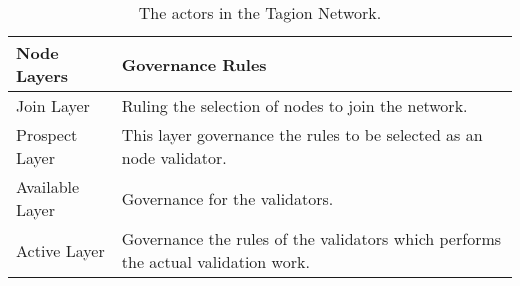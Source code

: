 \begin{table}[H]
 \begin{center}
  \begin{tabular}{|p{4cm}|p{8cm}|}
   \hline
   Node Layers & Governance Rules \\
   \hline
   Join Layer & Ruling the selection of nodes to join the network. \\
   \hline
   Prospect Layer &  This layer governance the rules to be selected as an node validator. \\
   \hline
   Available Layer & Governance for the validators. \\
   \hline
   Active Layer & Governance the rules of the validators which performs the actual validation work.  \\
   \hline  
  \end{tabular}
 \end{center}
 \caption{The actors in the Tagion Network.}
 \label{tab:node_governance_layers}
\end{table}
